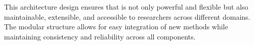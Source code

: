 This architecture design ensures that \hpfracc is not only powerful and flexible but also maintainable, extensible, and accessible to researchers across different domains. The modular structure allows for easy integration of new methods while maintaining consistency and reliability across all components.
